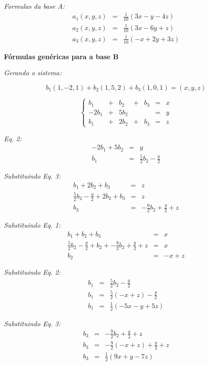\documentclass[11pt]{article}
\newenvironment{question}[1]
  {\par\addvspace{\medskipamount}
   \noindent\makebox[0pt][r]{\textbf{#1)} }\ignorespaces}
  {\par\addvspace{\medskipamount}}
\begin{document}
\begin{question}{1}
\bigskip
\textit{Formulas da base A:}
$$
\begin{array}{rcl}
    a_1(x,y,z) &= &\frac{1}{10}(3x-y-4z)\\
    a_2(x,y,z) &= &\frac{1}{10}(3x-6y+z)\\
    a_3(x,y,z) &= &\frac{1}{10}(-x+2y+3z)
\end{array}
$$

\newpage
\bigskip
\textbf{Fórmulas genéricas para a base B}

\bigskip
\textit{Gerando o sistema:} 

$$b_1(1,-2,1)+b_2(1,5,2)+b_3(1,0,1)=(x,y,z)$$

$$
\left\{\begin{array}{rcrcrcr}
    b_1   &+ &b_2  &+ &b_3 &= &x\\
    -2b_1 &+ &5b_2 &  &    &= &y\\
    b_1   &+ &2b_2 &+ &b_3 &= &z
\end{array}\right.
$$

\textit{Eq. 2:}
$$
\begin{array}{rcl}
    -2b_1 + 5b_2 &= &y\\
    b_1 &= &\frac{5}{2}b_2-\frac{y}{2}
\end{array}
$$

\bigskip
\textit{Substituindo Eq. 3:}
$$
\begin{array}{rcl}
    b_1+2b_2+b_3 &= &z\\
    \frac{5}{2}b_2-\frac{y}{2}+2b_2+b_3 &= &z\\
    b_3 &= &-\frac{9}{2}b_2+\frac{y}{2}+z
\end{array}
$$

\bigskip
\textit{Substituindo Eq. 1:}
$$
\begin{array}{rcl}
    b_1+b_2+b_3 &= &x\\
    \frac{5}{2}b_2-\frac{y}{2}+b_2+-\frac{9}{2}b_2+\frac{y}{2}+z &= &x\\
    b_2 &= &-x+z
\end{array}
$$

\bigskip
\textit{Substituindo Eq. 2:}
$$
\begin{array}{rcl}
    b_1 &= &\frac{5}{2}b_2-\frac{y}{2}\\
    b_1 &= &\frac{5}{2}(-x+z)-\frac{y}{2}\\
    b_1 &= &\frac{1}{2}(-5x-y+5z)
\end{array}
$$

\bigskip
\textit{Substituindo Eq. 3:}
$$
\begin{array}{rcl}
    b_3 &= &-\frac{9}{2}b_2+\frac{y}{2}+z\\
    b_3 &= &-\frac{9}{2}(-x+z)+\frac{y}{2}+z\\
    b_3 &= &\frac{1}{2}(9x+y-7z)
\end{array}
$$


\end{question}
\end{document}
